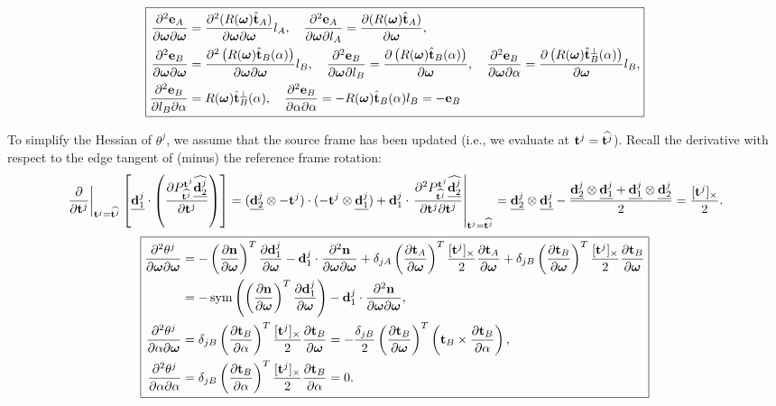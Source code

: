 \documentclass[10pt]{article}
\DeclareMathOperator*{\sym}{sym}
\providecommand{\cross}{\times}
\providecommand{\pder}[2]{\frac{\partial #1}{\partial #2}}
\providecommand{\spder}[3]{\frac{\partial^2 #1}{\partial #2 \partial #3}}
\renewcommand{\vec}[1]{{\bf #1}}
\def\normal{{\bf n}}
\def\n{\normal}
\def\d{\vec{d}}
\def\t{\vec{t}}
\def\w{\boldsymbol{\omega}}
\def\e{\vec{e}}
\providecommand\ts[1]{\widehat{\vec{t}^{#1}}}
\providecommand\ds[2]{\widehat{\vec{d}^{#1}_{#2}}}
\providecommand\tsA{\hat{\vec{t}}_A}
\providecommand\tsB{\hat{\vec{t}}_B}
\begin{document}
\begin{equation*}
\boxed{
\begin{aligned}
    \spder{\e_A}{\w}{\w} &= \spder{(R(\w) \tsA)}{\w}{\w} l_A, \quad
    \spder{\e_A}{\w}{l_A} = \pder{(R(\w) \tsA)}{\w},
\\
    \spder{\e_B}{\w}{\w} &= \spder{\left(R(\w) \tsB(\alpha) \right)}{\w}{\w} l_B, \quad
    \spder{\e_B}{\w}{l_B} = \pder{\left(R(\w) \tsB(\alpha) \right)}{\w}, \quad
    \spder{\e_B}{\w}{\alpha} = \pder{\left(R(\w) \tsB^\perp(\alpha) \right)}{\w} l_B,
\\
    \spder{\e_B}{l_B}{\alpha} &= R(\w) \tsB^\perp(\alpha), \quad
    \spder{\e_B}{\alpha}{\alpha} = -R(\w) \tsB(\alpha) l_B = -\e_B
\end{aligned}
}
\end{equation*}

To simplify the Hessian of $\theta^j$, we assume that the source frame has been updated
(i.e., we evaluate at $\t^j = \ts{j}$). Recall
the derivative
with respect to the edge tangent of (minus) the reference frame rotation:
$$
\left.\pder{}{\t^j}\right|_{\t^j = \ts{j}} \left[\underline{\d^j_1} \cdot \left(\pder{P_{\ts{j}}^{\t^j} \underline{\ds{j}{2}}}{\t^j} \right)\right]
= (\underline{\d^j_2} \otimes -\t^j) \cdot (-\t^j \otimes \underline{\d^j_1}) + \d^j_1 \cdot \left.\spder{P_{\ts{j}}^{\t^j}\underline{\ds{j}{2}}}{\t^j}{\t^j}\right|_{\t^j = \ts{j}}
= \underline{\d^j_2} \otimes \underline{\d^j_1} -
  \frac{\underline{\d^j_2} \otimes \underline{\d^j_1}  +
        \underline{\d^j_1} \otimes \underline{\d^j_2}}{2} = \frac{[\t^j]_\cross}{2}.
$$
\begin{equation*}
\boxed{
\begin{aligned}
    \spder{\theta^j}{\w}{\w} &= -\left(\pder{\n}{\w}\right)^T \pder{\d^j_1}{\w} - \d_1^j \cdot \spder{\n}{\w}{\w}
        + \delta_{jA} \left(\pder{\t_A}{\w}\right)^T \frac{[\t^j]_\cross}{2} \pder{\t_A}{\w}
        + \delta_{jB} \left(\pder{\t_B}{\w}\right)^T \frac{[\t^j]_\cross}{2} \pder{\t_B}{\w}
\\
    &= -\sym\left(\left(\pder{\n}{\w}\right)^T \pder{\d^j_1}{\w}\right) - \d_1^j \cdot \spder{\n}{\w}{\w},
\\
    \spder{\theta^j}{\alpha}{\w} &= 
        \delta_{jB} \left(\pder{\t_B}{\alpha}\right)^T \frac{[\t^j]_\cross}{2} \pder{\t_B}{\w} =
       -\frac{\delta_{jB}}{2} \left(\pder{\t_B}{\w}\right)^T \left(\t_B \cross \pder{\t_B}{\alpha}\right),
\\
    \spder{\theta^j}{\alpha}{\alpha} &= 
        \delta_{jB} \left(\pder{\t_B}{\alpha}\right)^T \frac{[\t^j]_\cross}{2} \pder{\t_B}{\alpha} = 0.
\end{aligned}
}
\end{equation*}



\end{document}
